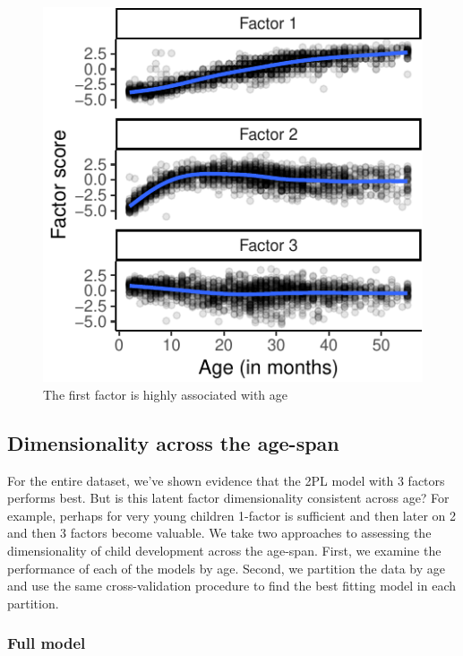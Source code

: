 \documentclass[10pt, letterpaper]{article}
\newenvironment{CodeChunk}{}{}
\begin{document}
\begin{CodeChunk}
\begin{figure}[tb]
\includegraphics{figs/factorscores-1} \caption[The first factor is highly associated with age]{The first factor is highly associated with age}\label{fig:factorscores}
\end{figure}
\end{CodeChunk}

\hypertarget{dimensionality-across-the-age-span}{%
\subsection{Dimensionality across the
age-span}\label{dimensionality-across-the-age-span}}

For the entire dataset, we've shown evidence that the 2PL model with 3
factors performs best. But is this latent factor dimensionality
consistent across age? For example, perhaps for very young children
1-factor is sufficient and then later on 2 and then 3 factors become
valuable. We take two approaches to assessing the dimensionality of
child development across the age-span. First, we examine the performance
of each of the models by age. Second, we partition the data by age and
use the same cross-validation procedure to find the best fitting model
in each partition.

\vskip 0.1in

\hypertarget{full}{%
\subsubsection{Full model}\label{full}}
\end{document}
